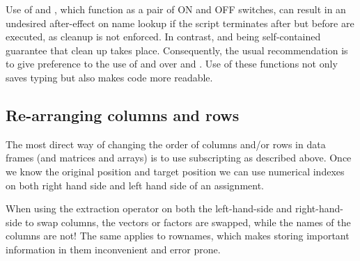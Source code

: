 \documentclass[krantz2]{krantz}\usepackage{knitr}%
\begin{document}
\begin{explainbox}
Use of  and , which function as a pair of ON and OFF switches, can result in an undesired after-effect on name lookup if the script terminates after  but before  are executed, as cleanup is not enforced. In contrast,  and  being self-contained guarantee that clean up takes place. Consequently, the usual recommendation is to give preference to the use of  and  over  and . Use of these functions not only saves typing but also makes code more readable.
\end{explainbox}

\subsection{Re-arranging columns and rows}
The most direct way of changing the order of columns and/or rows in data frames (and matrices and arrays) is to use subscripting as described above. Once we know the original position and target position we can use numerical indexes on both right hand side and left hand side of an assignment.

\begin{warningbox}
When using the extraction operator \Roperator{[]} on both the left-hand-side and right-hand-side to swap columns, the vectors or factors are swapped, while the names of the columns are not! The same applies to rownames, which makes storing important information in them inconvenient and error prone.
\end{warningbox}
\end{document}
